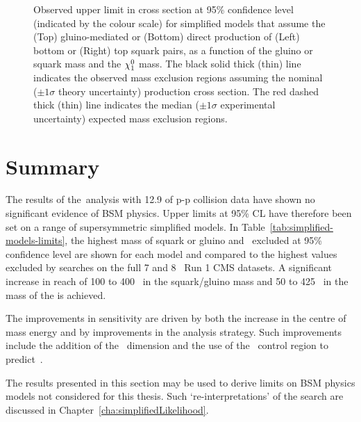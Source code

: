 \begin{figure}[thp!]
\begin{center}
    \caption{Observed upper limit in cross section at 95\% confidence
      level (indicated by the colour scale) for simplified models that
      assume the (Top) gluino-mediated or (Bottom) direct production
      of (Left) bottom or (Right) top squark pairs, as a function of
      the gluino or squark mass and the $\chi^{0}_{1}$ 
      mass. The black solid thick (thin) line indicates the observed
      mass exclusion regions assuming the nominal (${\pm}1 \sigma$
      theory uncertainty) production cross section. The red dashed
      thick (thin) line indicates the median (${\pm}1 \sigma$
      experimental uncertainty) expected mass exclusion
      regions. 
      \label{fig:limits-sms} }
  \end{center}
\end{figure}

\section{Summary}

The results of the~\alphat analysis with 12.9 \ifb of p-p collision data have shown no significant
evidence of BSM physics. Upper limits at 95\% CL have therefore been set on a range 
of supersymmetric simplified models. In Table~\ref{tab:simplified-models-limits}, the highest mass 
of squark or gluino and \chiz~excluded at 95\% confidence level are shown for each model and compared to the highest
values excluded by searches on the full 7 and 8 \TeV~Run 1 CMS datasets. 
A significant increase in reach of 100 to 400 \GeV~in the
squark/gluino mass and 50 to 425 \GeV~in the mass of the \chiz is achieved. 

The improvements in sensitivity are driven by both the increase in the 
centre of mass energy and by improvements in the analysis strategy. Such improvements
include the addition of the \mht~dimension and the use of the \mj~control region
to predict~\zInv.


The results presented in this section may be used to derive limits on BSM physics models 
not considered for this thesis. Such `re-interpretations' of the \alphat search 
are discussed in Chapter~\ref{cha:simplifiedLikelihood}.

